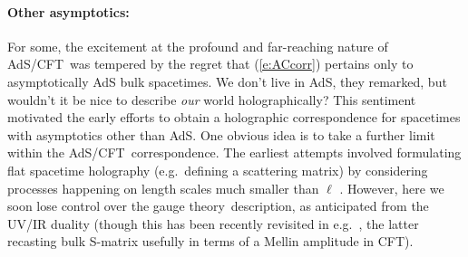 \documentclass[12pt]{article}
\def\req#1{(\ref{#1})}
\def\AC{AdS/CFT}
\def\GT{gauge theory}
\def\Rads{\ell}
\begin{document}
\paragraph{Other asymptotics:}  %
For some, the excitement at the profound and far-reaching nature of \AC\ was tempered by the regret that \req{e:ACcorr} pertains only to asymptotically AdS bulk spacetimes.  We don't live in AdS, they remarked, but wouldn't it be nice to  describe {\it our} world holographically?
This sentiment motivated the early efforts to obtain a holographic correspondence for  spacetimes with asymptotics other than AdS.
One obvious idea is to take a further limit within the \AC\ correspondence.  The earliest attempts involved formulating flat spacetime holography (e.g.\ defining a scattering matrix) by considering processes happening on length scales much smaller than $\Rads$ \cite{Susskind:1998vk,Polchinski:1999ry,Giddings:1999jq}.
However, here we soon lose control over the \GT\ description, as anticipated from the UV/IR duality (though this has been recently revisited in e.g.\ \cite{Heemskerk:2009pn,Penedones:2010ue}, the latter recasting bulk S-matrix usefully in terms of a Mellin amplitude in CFT).
\end{document}
